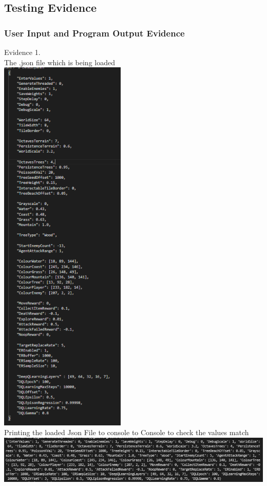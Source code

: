\pagebreak
\vspace{1cm}
\subsection{Testing Evidence}
\vspace{0.5cm}

\subsubsection{User Input and Program Output Evidence}

\setcounter{magicrownumbers}{0}
\normalsize
\begin{center}
    {\large Evidence 1.\rn }\\ 
    \vspace{0.3cm}
    The .json file which is being loaded \\
    \includegraphics[width=6cm]{Images/Testing/T1.1.1.PNG} \\
    Printing the loaded Json File to console to Console to check the values match\\
    \includegraphics[width=16cm]{Images/Testing/T1.1.2.PNG} \\
    \vspace{1cm}


\end{center}
